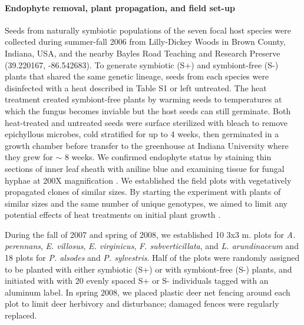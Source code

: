 \documentclass[12pt]{article}
\begin{document}
\paragraph*{Endophyte removal, plant propagation, and field set-up}
Seeds from naturally symbiotic populations of the seven focal host species were collected during summer-fall 2006 from Lilly-Dickey Woods in Brown County, Indiana, USA, and the nearby Bayles Road Teaching and Research Preserve (39.220167, -86.542683). 
To generate symbiotic (S+) and symbiont-free (S-) plants that shared the same genetic lineage, seeds from each species were disinfected with a heat described in Table S1 or left untreated. 
The heat treatment created symbiont-free plants by warming seeds to temperatures at which the fungus becomes inviable but the host seeds can still germinate.
Both heat-treated and untreated seeds were surface sterilized with bleach to remove epichyllous microbes, cold stratified for up to 4 weeks, then germinated in a growth chamber before transfer to the greenhouse at Indiana University where they grew for $\sim$ 8 weeks. 
We confirmed endophyte status by staining thin sections of inner leaf sheath with aniline blue and examining tissue for fungal hyphae at 200X magnification \cite{bacon2018stains}. 
We established the field plots with vegetatively propagated clones of similar sizes. 
By starting the experiment with plants of similar sizes and the same number of unique genotypes, we aimed to limit any potential effects of heat treatments on initial plant growth \cite{rudgers2009benefits}.

During the fall of 2007 and spring of 2008, we established 10 3x3 m. plots for \emph{A. perennans}, \emph{E. villosus}, \emph{E. virginicus}, \emph{F. subverticillata}, and \emph{L. arundinaceum}  and 18 plots for \emph{P. alsodes} and \emph{P. sylvestris}.
Half of the plots were randomly assigned to be planted with either symbiotic (S+) or with symbiont-free (S-) plants, and initiated with with 20 evenly spaced S+ or S- individuals tagged with an aluminum label.
In spring 2008, we placed plastic deer net fencing around each plot to limit deer herbivory and disturbance; damaged fences were regularly replaced.
\end{document}
